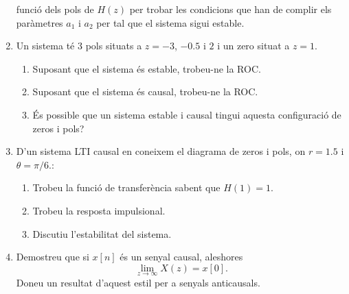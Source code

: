\documentclass[a4paper,12pt]{article}
\begin{document}
\begin{enumerate}
  funció dels pols de $H(z)$ per trobar les condicions que han de
  complir els paràmetres $a_1$ i $a_2$ per tal que el sistema sigui
  estable.
\item Un sistema té 3 pols situats a $z=-3$, $-0.5$ i $2$ i un zero
  situat a $z=1$. 
  \begin{enumerate}
  \item Suposant que el sistema és estable, trobeu-ne la ROC.
  \item Suposant que el sistema és causal, trobeu-ne la ROC.
  \item És possible que un sistema estable i causal tingui aquesta
    configuració de zeros i pols?
  \end{enumerate}
  \newpage{}
\item D'un sistema LTI causal en coneixem el diagrama de zeros i pols,
on $r=1.5$ i $\theta=\pi/6$.:
  \begin{figure*}[htbp]
    \centering
    
  \end{figure*}
  
  \begin{enumerate}
  \item Trobeu la funció de transferència sabent que $H(1)=1$.
  \item Trobeu la resposta impulsional.
  \item Discutiu l'estabilitat del sistema.
  \end{enumerate}
\item Demostreu que si $x[n]$ és un senyal causal, aleshores
  $$\lim_{z\to\infty}X(z)=x[0].$$
  Doneu un resultat d'aquest estil per a senyals anticausals.
\end{enumerate}

%
%
\end{document}
